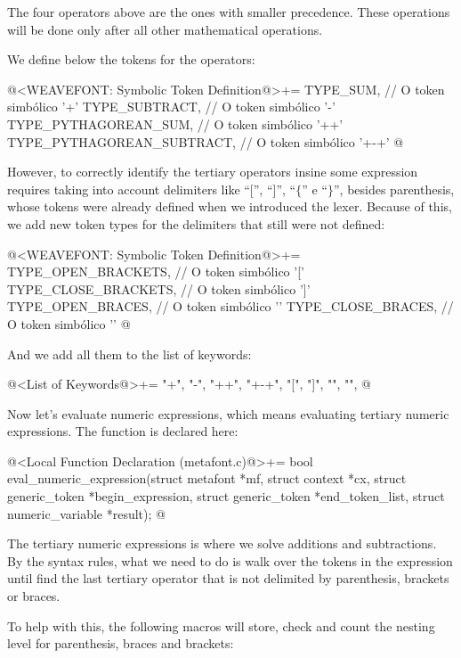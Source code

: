 The four operators above are the ones with smaller precedence. These
operations will be done only after all other mathematical operations.

We define below the tokens for the operators:

\iniciocodigo
@<WEAVEFONT: Symbolic Token Definition@>+=
TYPE_SUM,                   // O token simbólico '+'
TYPE_SUBTRACT,              // O token simbólico '-'
TYPE_PYTHAGOREAN_SUM,       // O token simbólico '++'
TYPE_PYTHAGOREAN_SUBTRACT,  // O token simbólico '+-+'
@
\fimcodigo

However, to correctly identify the tertiary operators insine some
expression requires taking into account delimiters like ``['',
``]'', ``$\{$'' e ``$\}$'', besides parenthesis, whose tokens were
already defined when we introduced the lexer. Because of this, we add
new token types for the delimiters that still were not defined:

\iniciocodigo
@<WEAVEFONT: Symbolic Token Definition@>+=
TYPE_OPEN_BRACKETS,         // O token simbólico '['
TYPE_CLOSE_BRACKETS,        // O token simbólico ']'
TYPE_OPEN_BRACES,           // O token simbólico '{'
TYPE_CLOSE_BRACES,          // O token simbólico '}'
@
\fimcodigo

And we add all them to the list of keywords:

\iniciocodigo
@<List of Keywords@>+=
"+", "-", "++", "+-+", "[", "]", "{", "}",
@
\fimcodigo

Now let's evaluate numeric expressions, which means evaluating
tertiary numeric expressions. The function is declared here:

\iniciocodigo
@<Local Function Declaration (metafont.c)@>+=
bool eval_numeric_expression(struct metafont *mf, struct context *cx,
                             struct generic_token *begin_expression,
                             struct generic_token *end_token_list,
                             struct numeric_variable *result);
@
\fimcodigo

The tertiary numeric expressions is where we solve additions and
subtractions. By the syntax rules, what we need to do is walk over the
tokens in the expression until find the last tertiary operator that is
not delimited by parenthesis, brackets or braces.

To help with this, the following macros will store, check and count
the nesting level for parenthesis, braces and brackets:

